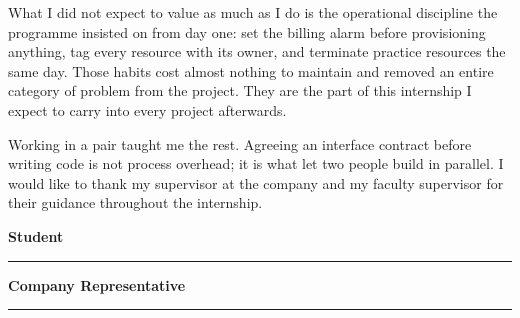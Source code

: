 What I did not expect to value as much as I do is the operational discipline the
programme insisted on from day one: set the billing alarm before provisioning
anything, tag every resource with its owner, and terminate practice resources
the same day. Those habits cost almost nothing to maintain and removed an entire
category of problem from the project. They are the part of this internship I
expect to carry into every project afterwards.

Working in a pair taught me the rest. Agreeing an interface contract before
writing code is not process overhead; it is what let two people build in
parallel. I would like to thank my supervisor at the company and my faculty
supervisor for their guidance throughout the internship.

\newpage
\vspace*{1cm}

\noindent
\begin{minipage}[t]{0.45\textwidth}
    \centering
    \textbf{Student}\\[0.2cm]

    \vspace{2.2cm}

    \rule{0.8\linewidth}{0.4pt}
\end{minipage}
\hfill
\begin{minipage}[t]{0.45\textwidth}
    \centering
    \textbf{Company Representative}\\[0.2cm]

    \vspace{2.2cm}

    \rule{0.8\linewidth}{0.4pt}
\end{minipage}
